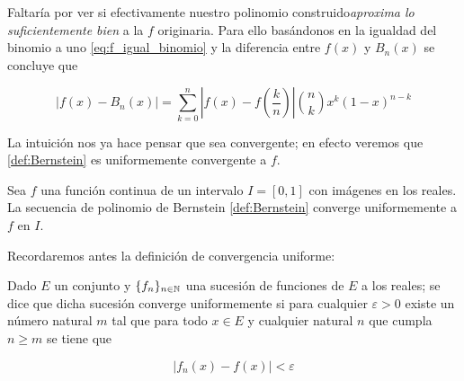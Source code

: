 Faltaría por ver si efectivamente nuestro polinomio construido\textit{aproxima lo suficientemente bien} a la $f$ originaria. 
Para ello basándonos en la igualdad del binomio a uno \eqref{eq:f_igual_binomio} y la diferencia entre $f(x)$ y $B_n(x)$ se concluye que


\begin{equation} \label{eq:berstein_diferencia}
    |f(x)-B_n(x)| = \sum_{k=0}^n \left|f(x) - f \left( \frac{k}{n} \right)\right|
    \binom{n}{k} x^{k} (1-x)^{n-k}
\end{equation} 

La intuición nos ya
hace pensar que sea convergente; en efecto veremos que \ref{def:Bernstein}
 es uniformemente convergente a $f$. 

\begin{teorema}\label{teo:aproximacion_bernstein}

    Sea $f$ una función continua de un intervalo $I = [0,1]$ con imágenes en los reales. 
    La secuencia de polinomio de Bernstein
    \ref{def:Bernstein} converge uniformemente a $f$ en $I.$
    
\end{teorema}
Recordaremos antes la definición de convergencia uniforme: 

\begin{definicion}

    Dado $E$ un conjunto y $\{f_n\}_{n \in \mathbb{N}}$ una sucesión de funciones de $E$
     a los reales; se dice 
    que dicha sucesión converge uniformemente si para cualquier $\varepsilon > 0$ existe un número natural $m$ tal que 
    para todo $x   \in E$ y cualquier natural $n$ que cumpla $n \geq m$ se tiene que 

    \begin{equation*}
        |f_n(x) - f(x) | < \varepsilon
    \end{equation*}
    
\end{definicion}


